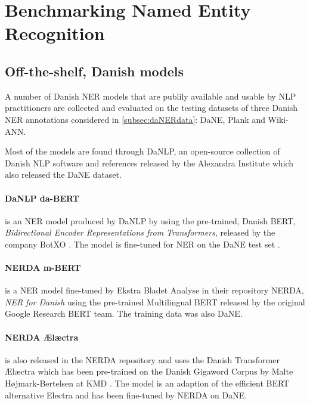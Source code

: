 \documentclass[main.tex]{subfiles}
\begin{document}
\section{Benchmarking Named Entity Recognition}
\subsection{Off-the-shelf, Danish models}
\label{sec:exidan}
A number of Danish NER models that are publily available and usable by NLP practitioners are collected and evaluated on the testing datasets of three Danish NER annotations considered in \ref{subsec:daNERdata}: DaNE, Plank and Wiki-ANN.

Most of the models are found through DaNLP\footnotemark, an open-source collection of Danish NLP software and references released by the Alexandra Institute which also released the DaNE dataset.
\paragraph{DaNLP da-BERT}
is an NER model produced by DaNLP by using the pre-trained, Danish BERT, \emph{Bidirectional Encoder Representations from Transformers}, \cite{devlin2019bert} released by the company BotXO \cite{botxo2019dabert}.
The model is fine-tuned for NER on the DaNE test set \cite{hvingelby2020dane}.
\paragraph{NERDA m-BERT}
is a NER model fine-tuned by Ekstra Bladet Analyse in their repository NERDA\footnotemark, \emph{NER for Danish} using the pre-trained Multilingual BERT released by the original Google Research BERT team\cite{devlin2019bert}.
The training data was also DaNE.
\paragraph{NERDA Ælæctra}
is also released in the NERDA repository and uses the Danish Transformer Ælæctra which has been pre-trained on the Danish Gigaword Corpus by Malte Højmark-Bertelsen at KMD \cite{bertelsen2020lctra}.
The model is an adaption of the efficient BERT alternative Electra \cite{clark2020electra} and has been fine-tuned by NERDA on DaNE.
\end{document}
